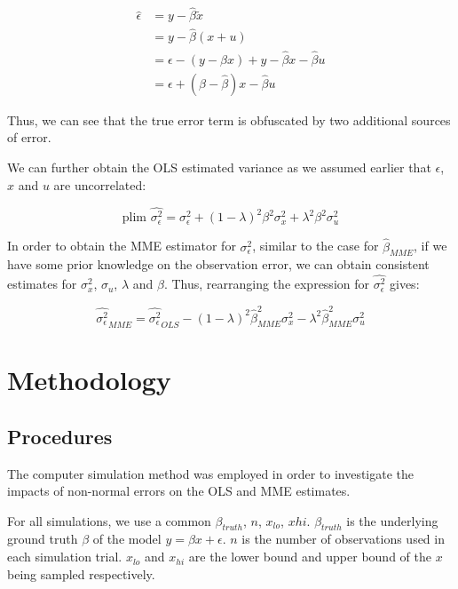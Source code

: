 \documentclass{article}
\begin{document}
\begin{equation}
    \begin{split}
        \hat{\epsilon}  &= y - \hat{\beta} \tilde{x} \\
                        &= y - \hat{\beta}(x+u) \\
                        &= \epsilon - (y - \beta x) + y - \hat{\beta}x - \hat{\beta}u \\
                        &= \epsilon + (\beta - \hat{\beta})x - \hat{\beta}u
    \end{split} 
\end{equation}

Thus, we can see that the true error term is obfuscated by two additional sources of error. 

We can further obtain the OLS estimated variance as we assumed earlier that $\epsilon$, $x$ and $u$ are uncorrelated:

\[
    \textrm{plim } \hat{\sigma^2_\epsilon} = \sigma_\epsilon^2 + (1-\lambda)^2 \beta^2 \sigma_x^2 + \lambda^2 \beta^2 \sigma_u^2   
\]

In order to obtain the MME estimator for $\sigma^2_\epsilon$, similar to the case for $\hat{\beta}_{MME}$, if we have some prior knowledge on the observation error, we can obtain consistent estimates for $\sigma_x^2$, $\sigma_u$, $\lambda$ and $\beta$.
Thus, rearranging the expression for $\hat{\sigma^2_\epsilon}$ gives:

\[
    \hat{\sigma_\epsilon^2}_{MME} = \hat{\sigma^2_\epsilon}_{OLS} -  (1-\lambda)^2 \hat{\beta}_{MME}^2 \sigma_x^2 - \lambda^2 \hat{\beta}_{MME}^2 \sigma_u^2   
\]

\section{Methodology}

\subsection{Procedures}

The computer simulation method was employed in order to investigate the impacts of non-normal errors on the OLS and MME estimates.

For all simulations, we use a common $\beta_{truth}$, $n$, $x_{lo}$, $x{hi}$. $\beta_{truth}$ is the underlying ground truth $\beta$ of the model $y=\beta x + \epsilon$. $n$ is the number of observations used in each simulation trial. $x_{lo}$ and $x_{hi}$ are the lower bound and upper bound of the $x$ being sampled respectively.
\end{document}
